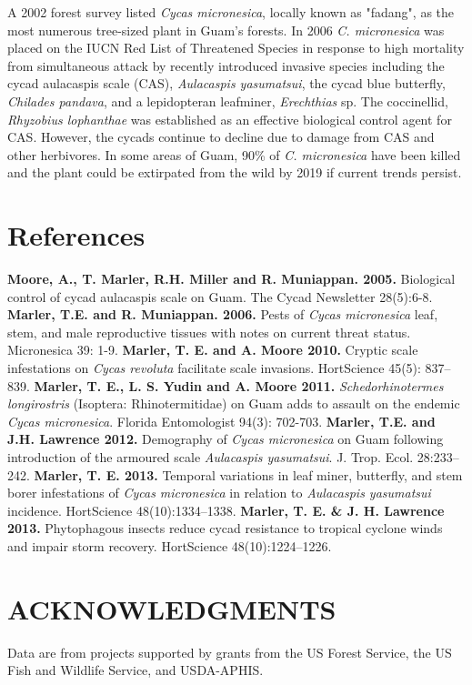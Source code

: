 \documentclass[custom]{sciposter}
\begin{document}
\begin{multicols*}{3}
A 2002 forest survey listed \textit{Cycas micronesica}, locally known as "fadang", as the most numerous tree-sized plant in Guam's forests.   In 2006 \textit{C. micronesica} was placed on the IUCN Red List of Threatened Species in response to high mortality from simultaneous attack by recently introduced invasive species including the cycad aulacaspis scale (CAS), \textit{Aulacaspis yasumatsui}, the cycad blue butterfly, \textit{Chilades pandava}, and a lepidopteran leafminer, \textit{Erechthias} sp.  The coccinellid, \textit{Rhyzobius lophanthae} was established as an effective biological control agent for CAS.  However, the cycads continue to decline due to damage from CAS and other herbivores.  In some areas of Guam, 90\% of \textit{C. micronesica} have been killed and the plant could be extirpated from the wild by 2019 if current trends persist.
\columnbreak
\section*{References}

\textbf{Moore, A., T. Marler, R.H. Miller and R. Muniappan. 2005.} Biological control of cycad aulacaspis scale on Guam. The Cycad Newsletter 28(5):6-8. 
\newline
\textbf{Marler, T.E. and R. Muniappan.  2006.}  Pests of \textit{Cycas micronesica} leaf, stem, and male reproductive tissues with notes on current threat status.  Micronesica 39: 1-9.
\newline
\textbf{Marler, T. E. and A. Moore 2010.} Cryptic scale infestations on \textit{Cycas revoluta} facilitate scale invasions. HortScience 45(5): 837–839.
\newline
\textbf{Marler, T. E., L. S. Yudin and A. Moore 2011.} \textit{Schedorhinotermes longirostris} (Isoptera: Rhinotermitidae) on Guam adds to assault on the endemic \textit{Cycas micronesica}. Florida Entomologist 94(3): 702-703.
\newline
\textbf{Marler, T.E. and J.H. Lawrence 2012.} Demography of \textit{Cycas micronesica} on Guam following introduction of the armoured scale \textit{Aulacaspis yasumatsui}. J. Trop. Ecol. 28:233–242.
\newline
\textbf{Marler, T. E. 2013.} Temporal variations in leaf miner, butterfly, and stem borer infestations of \textit{Cycas micronesica} in relation to
\textit{Aulacaspis yasumatsui} incidence. HortScience 48(10):1334–1338. 
\newline
\textbf{Marler, T. E. \& J. H. Lawrence 2013.} Phytophagous insects reduce cycad resistance to tropical cyclone winds and impair storm recovery. HortScience 48(10):1224–1226.

\section*{ACKNOWLEDGMENTS}

Data are from projects supported by grants from the US Forest Service, the US Fish and Wildlife Service, and USDA-APHIS.

\end{multicols*}
\end{document}
